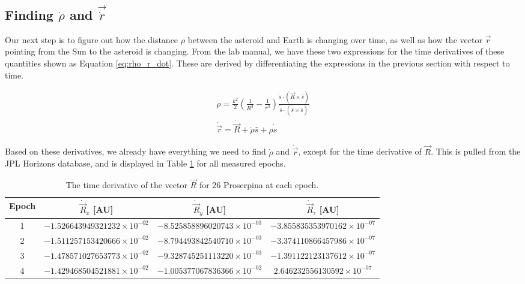\documentclass{article}
\begin{document}
\subsection{Finding $\dot{\rho}$ and $\vec{\dot{r}}$}

Our next step is to figure out how the distance $\rho$ between the asteroid and Earth is changing over time, as well as how the vector $\vec{r}$ pointing from the Sun to the asteroid is changing.
From the lab manual, we have these two expressions for the time derivatives of these quantities shown as Equation \ref{eq:rho_r_dot}. These are derived by differentiating the expressions in the previous section
with respect to time.

\begin{equation}
    \label{eq:rho_r_dot}
    \begin{aligned}
        \dot{\rho} = \frac{k^2}{2}(\frac{1}{R^3} - \frac{1}{r^3})\frac{\ddot{s} \cdot (\vec{R} \times \hat{s})}{\ddot{\hat{s}} \cdot (\dot{\hat{s}} \times \hat{s})}  \\    
        \dot{\vec{r}} = \dot{\vec{R}} + \dot{\rho}\hat{s} + \rho\dot{\hat{s}}
    \end{aligned}
\end{equation}

\noindent
Based on these derivatives, we already have everything we need to find $\dot{\rho}$ and $\dot{\vec{r}}$, except for the time derivative of $\vec{R}$. This is pulled from 
the JPL Horizons database, and is displayed in Table \ref{tab:R_dot} for all measured epochs. 

\begin{table}[H]
\centering
\begin{tabular}{|c|c|c|c|}
    \hline 
    \textbf{Epoch} & \textbf{$\dot{\vec{R}}_{x}$ [AU]} & \textbf{$\dot{\vec{R}}_{y}$ [AU]} & \textbf{$\dot{\vec{R}}_{z}$ [AU]} \\
    \hline
    1 & $-1.526643949321232 \times 10^{-02}$ & $-8.525858896020743 \times 10^{-03}$ & $-3.855835353970162 \times 10^{-07}$ \\
    \hline
    2 & $-1.511257153420666 \times 10^{-02}$ & $-8.794493842540710 \times 10^{-03}$ & $-3.374110866457986 \times 10^{-07}$ \\
    \hline
    3 & $-1.478571027653773 \times 10^{-02}$ & $-9.328745251113220 \times 10^{-03}$ & $-1.391122123137612 \times 10^{-07}$ \\
    \hline
    4 & $-1.429468504521881 \times 10^{-02}$ & $-1.005377067836366 \times 10^{-02}$ & $2.646232556130592 \times 10^{-07}$ \\
    \hline
\end{tabular}
    \caption{The time derivative of the vector $\vec{R}$ for 26 Proserpina at each epoch.}
    \label{tab:R_dot}
\end{table}
\end{document}
